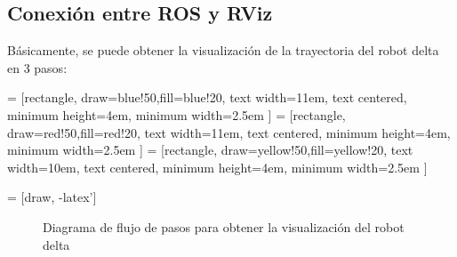    \subsection{Conexión entre ROS y RViz}
   
           Básicamente, se puede obtener la visualización de la trayectoria del robot delta en 3 pasos:


         = [rectangle, draw=blue!50,fill=blue!20, text width=11em, text centered, minimum height=4em, minimum width=2.5em ]
         = [rectangle, draw=red!50,fill=red!20, text width=11em, text centered, minimum height=4em, minimum width=2.5em ]
         = [rectangle, draw=yellow!50,fill=yellow!20, text width=10em, text centered, minimum height=4em, minimum width=2.5em ]
        
         = [draw, -latex']
         \begin{center}
         \begin{figure}[htb]
                \caption{Diagrama de flujo de pasos para obtener la visualización del robot delta}
                \label{f:cap6_trayectory_1}
         \end{figure}
         \end{center}
         
        \vspace{-1cm}   
        
